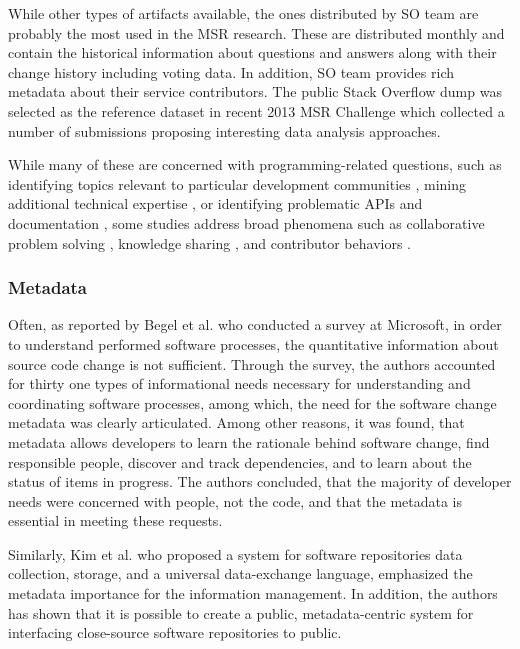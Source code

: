 While other types of artifacts available, the ones distributed by SO team are probably the most used in the MSR research. 
These are distributed monthly and contain the historical information about questions and answers along with their change 
history including voting data. In addition, SO team provides rich metadata about their service contributors. 
The public Stack Overflow dump was selected as the reference dataset in recent 2013 MSR Challenge \cite{MSRChallenge2013} 
which collected a number of submissions proposing interesting data analysis approaches.

While many of these are concerned with programming-related questions, such as identifying topics relevant to particular 
development communities \cite{kartik:msr14}, mining additional technical expertise \cite{VenkataramaniGAMB13} \cite{SaxeMG13}, 
or identifying problematic APIs \cite{KavalerPGCDF13} \cite{Linares2013Exploratory} and documentation \cite{Campbell2013Deficient},
some studies address broad phenomena such as collaborative problem solving \cite{Tausczik2014Collaborative},
knowledge sharing \cite{VasilescuCSCW14} \cite{Schenk2013Geo}, and contributor behaviors \cite{Bosu2013Building} \cite{GinscaP13}.

\subsubsection{Metadata}
Often, as reported by Begel et al. \cite{citeulike:7260421} who conducted a survey at Microsoft, in order to understand 
performed software processes, the quantitative information about source code change is not sufficient. 
Through the survey, the authors accounted for thirty one types of informational needs necessary for understanding and 
coordinating software processes, among which, the need for the software change metadata was clearly articulated. 
Among other reasons, it was found, that metadata allows developers to learn the rationale behind software change,
find responsible people, discover and track dependencies, and to learn about the status of items in progress. 
The authors concluded, that the majority of developer needs were concerned with people, not the code, and that the 
metadata is essential in meeting these requests.

Similarly, Kim et al. \cite{citeulike:4000311} who proposed a system for software repositories data collection, storage, 
and a universal data-exchange language, emphasized the metadata importance for the information management.
In addition, the authors has shown that it is possible to create a public, metadata-centric system for interfacing 
close-source software repositories to public.

